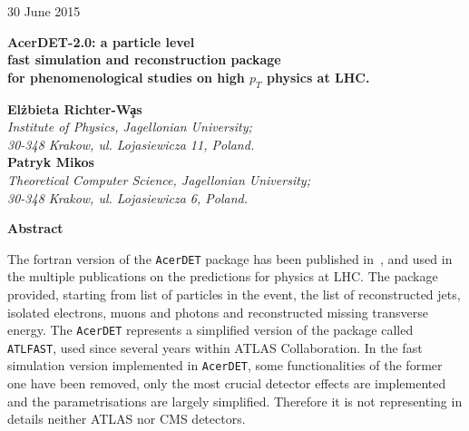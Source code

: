 \begin{titlepage}

\begin{flushright}
{\rm   30 June  2015}
\end{flushright}


\begin{center}
\vspace{2.0cm} 
  {\bf \LARGE AcerDET-2.0: a particle level } \\
\vspace{0.25cm} 
  {\bf \LARGE fast simulation and reconstruction package} \\
\vspace{0.25cm} 
  {\bf \LARGE for  phenomenological studies on high $p_T$ physics at LHC.}\\
\end{center}
\vspace{1.0cm} 
 

\begin{center}
 {\bf El\. zbieta Richter-W\c{a}s}\\ 
  {\em Institute of Physics, Jagellonian University;}\\
  {\em 30-348 Krakow, ul. Lojasiewicza 11, Poland.}\\
  {\bf Patryk Mikos}\\ 
  {\em Theoretical Computer Science, Jagellonian University;}\\
  {\em 30-348 Krakow, ul. Lojasiewicza 6, Poland.}\\
 
\end{center}

\vspace{1.0cm}
\begin{center}
{\bf Abstract}
\end{center}


The fortran version of the  {\tt AcerDET} package has been published in~\cite{AcerDET-1.0},
and used in the multiple publications on the predictions for physics at LHC.
The package provided, starting from list of particles in the event, the list of 
reconstructed jets, isolated electrons, muons and photons and
reconstructed missing transverse energy.
The {\tt AcerDET} represents a simplified version of the package called
{\tt ATLFAST}, used since several years within ATLAS Collaboration.
In the fast simulation version implemented in {\tt AcerDET}, some functionalities of the 
former one have been removed, only the most crucial detector effects are
implemented and the  parametrisations are largely simplified.
Therefore it is not representing in details neither ATLAS nor
CMS detectors.


\end{titlepage}
